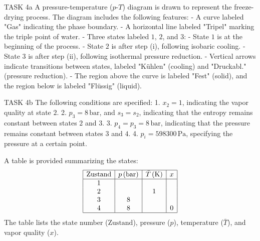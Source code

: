 TASK 4a  
A pressure-temperature (\( p \)-\( T \)) diagram is drawn to represent the freeze-drying process. The diagram includes the following features:  
- A curve labeled "Gas" indicating the phase boundary.  
- A horizontal line labeled "Tripel" marking the triple point of water.  
- Three states labeled \( 1 \), \( 2 \), and \( 3 \):  
  - State \( 1 \) is at the beginning of the process.  
  - State \( 2 \) is after step (i), following isobaric cooling.  
  - State \( 3 \) is after step (ii), following isothermal pressure reduction.  
- Vertical arrows indicate transitions between states, labeled "Kühlen" (cooling) and "Druckabl." (pressure reduction).  
- The region above the curve is labeled "Fest" (solid), and the region below is labeled "Flüssig" (liquid).  

TASK 4b  
The following conditions are specified:  
1. \( x_2 = 1 \), indicating the vapor quality at state \( 2 \).  
2. \( p_3 = 8 \, \text{bar} \), and \( s_3 = s_2 \), indicating that the entropy remains constant between states \( 2 \) and \( 3 \).  
3. \( p_4 = p_3 = 8 \, \text{bar} \), indicating that the pressure remains constant between states \( 3 \) and \( 4 \).  
4. \( p_i = 598300 \, \text{Pa} \), specifying the pressure at a certain point.  

A table is provided summarizing the states:  
\[
\begin{array}{|c|c|c|c|}
\hline
\text{Zustand} & p \, (\text{bar}) & \bar{T} \, (\text{K}) & x \\
\hline
1 & & & \\
2 & & 1 & \\
3 & 8 & & \\
4 & 8 & & 0 \\
\hline
\end{array}
\]  
The table lists the state number (\( \text{Zustand} \)), pressure (\( p \)), temperature (\( \bar{T} \)), and vapor quality (\( x \)).